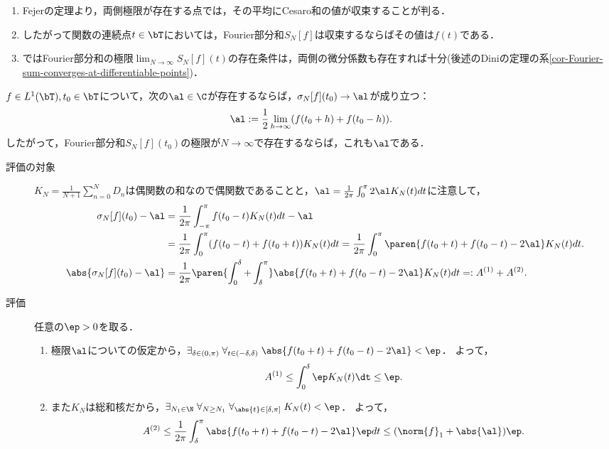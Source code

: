 \documentclass[uplatex,dvipdfmx]{jsreport}
\begin{document}
\begin{tcolorbox}[colframe=ForestGreen, colback=ForestGreen!10!white,breakable,colbacktitle=ForestGreen!40!white,coltitle=black,fonttitle=\bfseries\sffamily,
title=Fourier級数は元の関数の情報を十分に含んでおり，算術平均によって取り出せる]
    \begin{enumerate}
        \item Fejerの定理より，両側極限が存在する点では，その平均にCesaro和の値が収束することが判る．
        \item したがって関数の連続点$t\in\bT$においては，Fourier部分和$S_N[f]$は収束するならばその値は$f(t)$である．
        \item ではFourier部分和の極限$\lim_{N\to\infty}S_N[f](t)$の存在条件は，両側の微分係数も存在すれば十分(後述のDiniの定理の系\ref{cor-Fourier-sum-converges-at-differentiable-points})．
    \end{enumerate}
\end{tcolorbox}

\begin{theorem}[Fejer]
    $f\in L^1(\bT),t_0\in\bT$について，次の$\al\in\C$が存在するならば，$\sigma_N[f](t_0)\to\al$が成り立つ：
    \[\al:=\frac{1}{2}\lim_{h\to\infty}(f(t_0+h)+f(t_0-h)).\]
    したがって，Fourier部分和$S_N[f](t_0)$の極限が$N\to\infty$で存在するならば，これも$\al$である．
\end{theorem}
\begin{Proof}\mbox{}
    \begin{description}
        \item[評価の対象] $K_N=\frac{1}{N+1}\sum_{n=0}^ND_n$は偶関数の和なので偶関数であることと，$\al=\frac{1}{2\pi}\int^\pi_02\al K_N(t)dt$に注意して，
        \begin{align*}
            \sigma_N[f](t_0)-\al&=\frac{1}{2\pi}\int^\pi_{-\pi}f(t_0-t)K_N(t)dt-\al\\
            &=\frac{1}{2\pi}\int^\pi_0(f(t_0-t)+f(t_0+t))K_N(t)dt=\frac{1}{2\pi}\int^\pi_0\paren{f(t_0+t)+f(t_0-t)-2\al}K_N(t)dt.\\
            \abs{\sigma_N[f](t_0)-\al}&=\frac{1}{2\pi}\paren{\int^\delta_0+\int^\pi_{\delta}}\abs{f(t_0+t)+f(t_0-t)-2\al}K_N(t)dt=:A^{(1)}+A^{(2)}.
        \end{align*}
        \item[評価] 任意の$\ep>0$を取る．
        \begin{enumerate}
            \item 極限$\al$についての仮定から，$\exists_{\delta\in(0,\pi)}\;\forall_{t\in(-\delta,\delta)}\;\abs{f(t_0+t)+f(t_0-t)-2\al}<\ep$．
            よって，
            \[A^{(1)}\le\int^\delta_0\ep K_N(t)\dt\le\ep.\]
            \item また$K_N$は総和核だから，$\exists_{N_1\in\N}\;\forall_{N\ge N_1}\;\forall_{\abs{t}\in[\delta,\pi]}\;K_N(t)<\ep$．
            よって，
            \[A^{(2)}\le\frac{1}{2\pi}\int^\pi_\delta\abs{f(t_0+t)+f(t_0-t)-2\al}\ep dt\le(\norm{f}_1+\abs{\al})\ep.\]
        \end{enumerate}
    \end{description}
\end{Proof}
\end{document}
